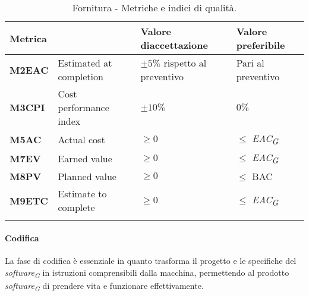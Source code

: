 \begin{longtable}{|C{1.9cm}|L{4cm}|L{2.2cm}|L{2.1cm}|}
    \hline
    \textbf{Metrica} &  & \textbf{Valore di\linebreak accettazione} & {\textbf{Valore \linebreak preferibile}} \\
    \hline \hline

    \textbf{M2EAC} & Estimated at completion & $\pm 5\%$ rispetto al preventivo & Pari al preventivo \\
    \hline

    \textbf{M3CPI} & Cost performance index & $\pm 10\%$ & $0\%$ \\
    \hline

    \textbf{M5AC} & Actual cost & $\geq 0 $ & $ \leq$ \textit{EAC}\textsubscript{\textit{G}}  \\
    \hline

    \textbf{M7EV} & Earned value & $\geq 0 $ & $\leq$ \textit{EAC}\textsubscript{\textit{G}}  \\
    \hline

    \textbf{M8PV} & Planned value & $\geq 0  $ & $ \leq$ BAC  \\
    \hline

    \textbf{M9ETC} & Estimate to complete & $\geq 0  $ & $ \leq$ \textit{EAC}\textsubscript{\textit{G}}  \\
    \hline

    \caption{Fornitura - Metriche e indici di qualità.}
    \label{tab:controllo_progetto}
\end{longtable}

\vspace{0.5cm}

\paragraph{Codifica}
La fase di codifica è essenziale in quanto trasforma il progetto e le specifiche del \textit{software}\textsubscript{\textit{G}} in istruzioni comprensibili dalla macchina, permettendo al prodotto \textit{software}\textsubscript{\textit{G}} di prendere vita e funzionare effettivamente.

\vspace{0.4cm}

